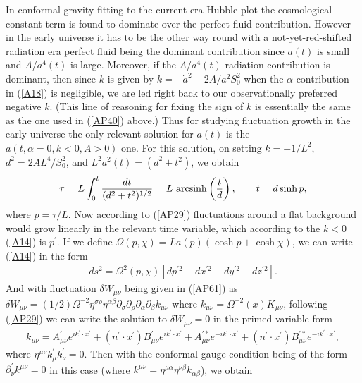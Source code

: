 \documentclass[aps]{revtex4}
\begin{document}
In conformal gravity fitting to the current era Hubble plot the cosmological constant term is found to dominate over the perfect fluid contribution. However in the early universe it has to be the other way round with a not-yet-red-shifted radiation era perfect fluid being the dominant contribution since $a(t)$ is small and $A/a^4(t)$ is large. Moreover, if the $A/a^4(t)$ radiation contribution is dominant, then since $k$ is given by $k=-\dot{a}^2-2A/a^2S_0^2$ when the $\alpha$ contribution in (\ref{A18}) is negligible, we are led right back to our observationally  preferred negative $k$. (This line of reasoning for  fixing the sign of $k$ is essentially the same as the one  used in (\ref{AP40}) above.) Thus for studying fluctuation growth in the early universe the only relevant solution for $a(t)$ is the $a(t,\alpha=0,k<0,A>0)$ one. For this solution, on setting $k=-1/L^2$, $d^2=2AL^4/S_0^2$, and $L^2a^2(t)=(d^2+t^2)$, we obtain
%
\begin{eqnarray}
\tau=L\int_0^t \frac{dt}{(d^2+t^2)^{1/2}}=L~{\rm arc sinh}\left(\frac{t}{d}\right),\qquad t=d\sinh p,
\label{B1}
\end{eqnarray}
%
where $p=\tau/L$. Now according to (\ref{AP29}) fluctuations around a flat background would grow linearly in the relevant time variable, which according to the $k<0$ (\ref{A14}) is $p^{\prime}$. If we define $\Omega(p,\chi)=La(p)(\cosh p+\cosh \chi)$, we can write (\ref{A14}) in the form
%
\begin{eqnarray}
ds^2=\Omega^2(p,\chi)\left[dp^{\prime 2}-dx^{\prime 2} -dy^{\prime 2} -dz^{\prime 2}\right].
\label{B2}
\end{eqnarray}
%
And with fluctuation $\delta W_{\mu\nu}$ being given in (\ref{AP61}) as $\delta W_{\mu\nu}=(1/2)\Omega^{-2}\eta^{\sigma\rho}\eta^{\alpha\beta}\partial_{\sigma}\partial_{\rho} \partial_{\alpha}\partial_{\beta}k_{\mu\nu}$ where $k_{\mu\nu}=\Omega^{-2}(x)K_{\mu\nu}$, following
(\ref{AP29}) we can write the solution to $\delta W_{\mu\nu}=0$ in the primed-variable form
%
\begin{eqnarray}
k_{\mu\nu}=A^{\prime}_{\mu\nu}e^{ik^{\prime}\cdot x^{\prime}}+(n^{\prime}\cdot x^{\prime})B^{\prime}_{\mu\nu}e^{ik^{\prime}\cdot x^{\prime}}+A^{\prime *}_{\mu\nu}e^{-ik^{\prime}\cdot x^{\prime}}+(n^{\prime}\cdot x^{\prime})B^{\prime *}_{\mu\nu}e^{-ik^{\prime}\cdot x^{\prime}},
\label{B3}
\end{eqnarray}
%
where $\eta^{\mu\nu}k^{\prime}_{\mu}k^{\prime}_{\nu}=0$. Then with the conformal gauge condition being of the form $\partial^{\prime}_{\nu}k^{\mu\nu}=0$ in this case (where $k^{\mu\nu}=\eta^{\mu\alpha}\eta^{\nu\beta}k_{\alpha\beta}$), we obtain 
\end{document}
